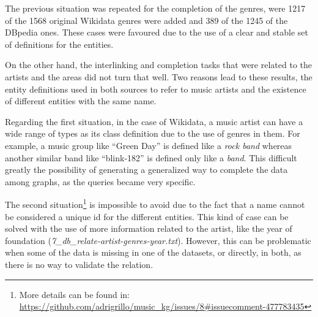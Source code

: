 The previous situation was repeated for the completion of the genres, were 1217 of the 1568 original Wikidata genres were added and 389 of the 1245 of the DBpedia ones. 
These cases were favoured due to the use of a clear and stable set of definitions for the entities. 

On the other hand, the interlinking and completion tasks that were related to the artists and the areas did not turn that well.
Two reasons lead to these results, the entity definitions used in both sources to refer to music artists and the existence of different entities with the same name.  

Regarding the first situation, in the case of Wikidata, a music artist can have a wide range of types as its class definition due to the use of genres in them. 
For example, a music group like ``Green Day'' is defined like a \textit{rock band} whereas another similar band like ``blink-182'' is defined only like a \textit{band}.
This difficult greatly the possibility of generating a generalized way to complete the data among graphs, as the queries became very specific. 

The second situation\footnote{More details can be found in: \url{https://github.com/adrigrillo/music_kg/issues/8\#issuecomment-477783435}} is impossible to avoid due to the fact that a name cannot be considered a unique id for the different entities.
This kind of case can be solved with the use of more information related to the artist, like the year of foundation (\textit{7\_db\_relate-artist-genres-year.txt}).
However, this can be problematic when some of the data is missing in one of the datasets, or directly, in both, as there is no way to validate the relation.

